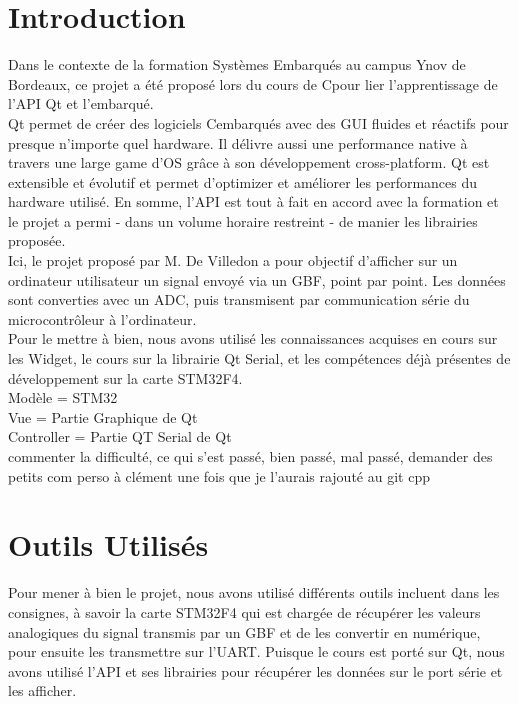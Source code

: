 \documentclass[11pt, french]{article}
\begin{document}
\newcommand{\CC}{C\nolinebreak\hspace{-.05em}\raisebox{.4ex}{\tiny\bf +}\nolinebreak\hspace{-.10em}\raisebox{.4ex}{\tiny\bf +}}
\def\CC{{C\nolinebreak[4]\hspace{-.05em}\raisebox{.4ex}{\tiny\bf ++}}}

\tableofcontents
\newpage
\section{Introduction}

Dans le contexte de la formation Systèmes Embarqués au campus Ynov de Bordeaux, ce projet a été proposé lors du cours de \CC pour lier l'apprentissage de l'API Qt et l'embarqué.\\
Qt permet de créer des logiciels \CC embarqués avec des GUI fluides et réactifs pour presque n'importe quel hardware. Il délivre aussi une performance native à travers une large game d'OS grâce à son développement cross-platform. Qt est extensible et évolutif et permet d'optimizer et améliorer les performances du hardware utilisé.
En somme, l'API est tout à fait en accord avec la formation et le projet a permi - dans un volume horaire restreint - de manier les librairies proposée.\\

Ici, le projet proposé par M. De Villedon a pour objectif d'afficher sur un ordinateur utilisateur un signal envoyé via un GBF, point par point. Les données sont converties avec un ADC, puis transmisent par communication série du microcontrôleur à l'ordinateur.\\
Pour le mettre à bien, nous avons utilisé les connaissances acquises en cours sur les Widget, le cours sur la librairie Qt Serial, et les compétences déjà présentes de développement sur la carte STM32F4.\\

Modèle = STM32\\
Vue = Partie Graphique de Qt\\
Controller = Partie QT Serial de Qt\\

commenter la difficulté, ce qui s'est passé, bien passé, mal passé, demander des petits com perso à clément une fois que je l'aurais rajouté au git cpp

\newpage

\section{Outils Utilisés}
Pour mener à bien le projet, nous avons utilisé différents outils incluent dans les consignes, à savoir la carte STM32F4 qui est chargée de récupérer les valeurs analogiques du signal transmis par un GBF et de les convertir en numérique, pour ensuite les transmettre sur l'UART.
Puisque le cours est porté sur Qt, nous avons utilisé l'API et ses librairies pour récupérer les données sur le port série et les afficher.
\end{document}
